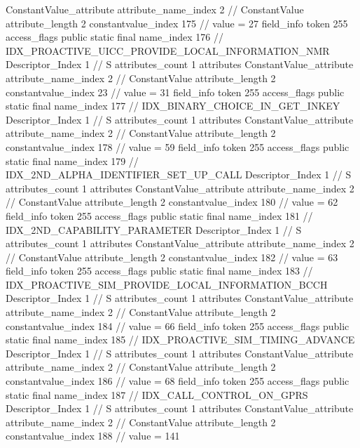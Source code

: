 {{{{{{				ConstantValue_attribute {
					attribute_name_index	2		// ConstantValue
					attribute_length	2
					constantvalue_index	175		// value = 27
				}
				}
			}
			field_info {
				token	255
				access_flags	public static final
				name_index	176		// IDX_PROACTIVE_UICC_PROVIDE_LOCAL_INFORMATION_NMR
				Descriptor_Index	1		// S
				attributes_count	1
				attributes {
				ConstantValue_attribute {
					attribute_name_index	2		// ConstantValue
					attribute_length	2
					constantvalue_index	23		// value = 31
				}
				}
			}
			field_info {
				token	255
				access_flags	public static final
				name_index	177		// IDX_BINARY_CHOICE_IN_GET_INKEY
				Descriptor_Index	1		// S
				attributes_count	1
				attributes {
				ConstantValue_attribute {
					attribute_name_index	2		// ConstantValue
					attribute_length	2
					constantvalue_index	178		// value = 59
				}
				}
			}
			field_info {
				token	255
				access_flags	public static final
				name_index	179		// IDX_2ND_ALPHA_IDENTIFIER_SET_UP_CALL
				Descriptor_Index	1		// S
				attributes_count	1
				attributes {
				ConstantValue_attribute {
					attribute_name_index	2		// ConstantValue
					attribute_length	2
					constantvalue_index	180		// value = 62
				}
				}
			}
			field_info {
				token	255
				access_flags	public static final
				name_index	181		// IDX_2ND_CAPABILITY_PARAMETER
				Descriptor_Index	1		// S
				attributes_count	1
				attributes {
				ConstantValue_attribute {
					attribute_name_index	2		// ConstantValue
					attribute_length	2
					constantvalue_index	182		// value = 63
				}
				}
			}
			field_info {
				token	255
				access_flags	public static final
				name_index	183		// IDX_PROACTIVE_SIM_PROVIDE_LOCAL_INFORMATION_BCCH
				Descriptor_Index	1		// S
				attributes_count	1
				attributes {
				ConstantValue_attribute {
					attribute_name_index	2		// ConstantValue
					attribute_length	2
					constantvalue_index	184		// value = 66
				}
				}
			}
			field_info {
				token	255
				access_flags	public static final
				name_index	185		// IDX_PROACTIVE_SIM_TIMING_ADVANCE
				Descriptor_Index	1		// S
				attributes_count	1
				attributes {
				ConstantValue_attribute {
					attribute_name_index	2		// ConstantValue
					attribute_length	2
					constantvalue_index	186		// value = 68
				}
				}
			}
			field_info {
				token	255
				access_flags	public static final
				name_index	187		// IDX_CALL_CONTROL_ON_GPRS
				Descriptor_Index	1		// S
				attributes_count	1
				attributes {
				ConstantValue_attribute {
					attribute_name_index	2		// ConstantValue
					attribute_length	2
					constantvalue_index	188		// value = 141
}}}}}}}
